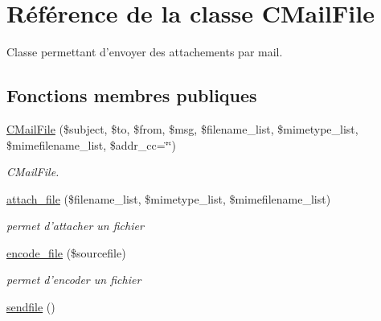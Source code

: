 \hypertarget{classCMailFile}{
\section{R\'{e}f\'{e}rence de la classe CMail\-File}
\label{classCMailFile}
}
Classe permettant d'envoyer des attachements par mail.  


\subsection*{Fonctions membres publiques}
\begin{CompactItemize}
\item 
\hyperlink{classCMailFile_a0}{CMail\-File} (\$subject, \$to, \$from, \$msg, \$filename\_\-list, \$mimetype\_\-list, \$mimefilename\_\-list, \$addr\_\-cc=\char`\"{}\char`\"{})
\begin{CompactList}\small\item\em CMail\-File. \item\end{CompactList}\item 
\hyperlink{classCMailFile_a1}{attach\_\-file} (\$filename\_\-list, \$mimetype\_\-list, \$mimefilename\_\-list)
\begin{CompactList}\small\item\em permet d'attacher un fichier \item\end{CompactList}\item 
\hyperlink{classCMailFile_a2}{encode\_\-file} (\$sourcefile)
\begin{CompactList}\small\item\em permet d'encoder un fichier \item\end{CompactList}\item 
\hypertarget{classCMailFile_a3}{
\hyperlink{classCMailFile_a3}{sendfile} ()}
\label{classCMailFile_a3}


\end{CompactItemize}
